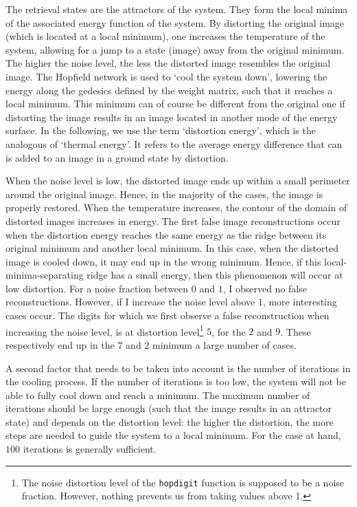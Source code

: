 \documentclass[10pt,a4paper]{article}
\begin{document}
The retrieval states are the attractors of the system. They form the local minima of the associated energy function of the system. By distorting the original image (which is located at a local minimum), one increases the temperature of the system, allowing for a jump to a state (image) away from the original minimum. The higher the noise level, the less the distorted image resembles the original image. The Hopfield network is used to `cool the system down', lowering the energy along the gedesics defined by the weight matrix, such that it reaches a local minimum. This minimum can of course be different from the original one if distorting the image results in an image located in another mode of the energy surface. In the following, we use the term `distortion energy', which is the analogous of `thermal energy'. It refers to the average energy difference that can is added to an image in a ground state by distortion. 

When the noise level is low, the distorted image ends up within a small perimeter around the original image. Hence, in the majority of the cases, the image is properly restored.
When the temperature increases, the contour of the domain of distorted images increases in energy. The first false image reconstructions occur when the distortion energy reaches the same energy as the ridge between its original minimum and another local minimum. In this case, when the distorted image is cooled down, it may end up in the wrong minimum. Hence, if this local-minima-separating ridge has a small energy, then this phenomenon will occur at low distortion.  For a noise fraction between $0$ and $1$, I observed no false reconstructions. However, if I increase the noise level above $1$, more interesting cases occur. The digits for which we first observe a false reconstruction when increasing the noise level, is at distortion level\footnote{The noise distortion level of the \texttt{hopdigit} function is supposed to be a noise fraction. However, nothing prevents us from taking values above 1.} $5$, for the $2$ and $9$. These respectively end up in the $7$ and $2$ minimum a large number of cases.

A second factor that needs to be taken into account is the number of iterations in the cooling process. If the number of iterations is too low, the system will not be able to fully cool down and reach a minimum. The maximum number of iterations should be large enough (such that the image results in an attractor state) and depends on the distortion level: the higher the distortion, the more steps are needed to guide the system to a local minimum. For the case at hand, $100$ iterations is generally sufficient.\\
\end{document}
